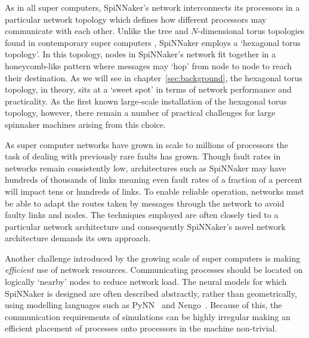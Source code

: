 As in all super computers, SpiNNaker's network interconnects its processors in
a particular network topology which defines how different processors may
communicate with each other. Unlike the tree and $N$-dimensional torus
topologies found in contemporary super computers \cite[chapter~3]{dally04},
SpiNNaker employs a `hexagonal torus topology'. In this topology, nodes in
SpiNNaker's network fit together in a honeycomb-like pattern where messages may
`hop' from node to node to reach their destination. As we will see in
chapter~\ref{sec:background}, the hexagonal torus topology, in theory, sits at
a `sweet spot' in terms of network performance and practicality. As the first
known large-scale installation of the hexagonal torus topology, however, there
remain a number of practical challenges for large spinnaker machines arising
from this choice.

As super computer networks have grown in scale to millions of processors the
task of dealing with previously rare faults has grown.  Though fault rates in
networks remain consistently low, architectures such as SpiNNaker may have
hundreds of thousands of links meaning even fault rates of a fraction of a
percent will impact tens or hundreds of links. To enable reliable operation,
networks must be able to adapt the routes taken by messages through the network
to avoid faulty links and nodes. The techniques employed are often closely tied
to a particular network architecture and consequently SpiNNaker's novel network
architecture demands its own approach.

Another challenge introduced by the growing scale of super computers is making
\emph{efficient} use of network resources. Communicating processes should be
located on logically `nearby' nodes to reduce network load. The neural models
for which SpiNNaker is designed are often described abstractly, rather than
geometrically, using modelling languages such as PyNN~\cite{davison08} and
Nengo~\cite{eliasmith04}.  Because of this, the communication requirements of
simulations can be highly irregular making an efficient placement of processes
onto processors in the machine non-trivial.

%

